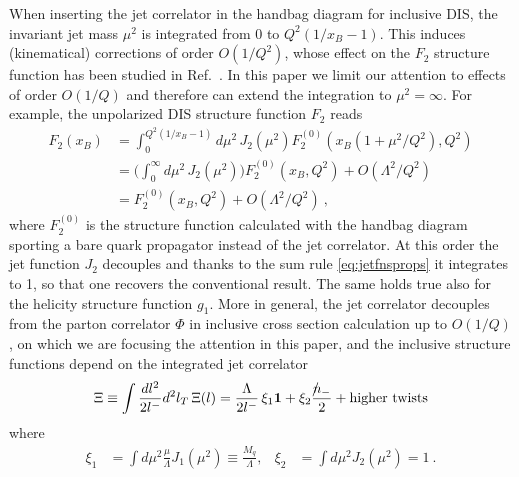 \documentclass[preprintnumbers,floatfix,nofootinbib]{revtex4}
\newcommand{\nslash}{n \hspace{-0.24cm} / \,}
\newcommand{\mj}{M_q}
\newcommand{\mjs}{\langle m_j^2 \rangle>}
\begin{document}
When inserting the jet correlator in the handbag diagram for inclusive DIS, the invariant jet mass $\mu^2$ is integrated from 0 to $Q^2(1/x_B-1)$. This induces (kinematical) corrections of order $O(1/Q^2)$, whose effect on the $F_2$ structure function has been studied in Ref.~\cite{Accardi-Qiu}. In this paper we limit our attention to effects of order $O(1/Q)$ and therefore can extend the integration to $\mu^2=\infty$. For example, the unpolarized DIS structure function $F_2$ reads
\begin{align}
  F_2(x_B) & = \int_0^{Q^2(1/x_B-1)}d\mu^2\, J_2(\mu^2) F_2^{(0)}(x_B(1+\mu^2/Q^2),Q^2)  \\
  & = \Big( \int_0^\infty d\mu^2\, J_2(\mu^2) \Big) F_2^{(0)}(x_B,Q^2) 
     + O(\Lambda^2/Q^2) \\
  & = F_2^{(0)}(x_B,Q^2)  + O(\Lambda^2/Q^2) \ ,
\label{eq:F2}
\end{align}
where $F_2^{(0)}$ is the structure function calculated with the handbag diagram sporting a bare quark propagator instead of the jet correlator.
At this order the jet function $J_2$ decouples and thanks to the sum rule \eqref{eq:jetfnsprops} it integrates to 1, so that one recovers the conventional result. The same holds true also for the helicity structure function $g_1$.
%
More in general, the jet correlator decouples from the parton correlator $\Phi$ in inclusive cross section calculation up to $O(1/Q)$, on which we are focusing the attention in this paper, and the inclusive structure functions depend on the integrated jet correlator
\begin{equation} 
  \Xi \equiv \int \frac{dl^2}{2l^-} d^2 l_T \, \Xi(l) 
    =  \frac{\Lambda}{2 l^-}\,\xi_1 {\bm 1}
    +  \xi_2 \frac{\nslash_-}{2} 
    + \text{higher\ twists}
\end{equation} 
where 
\begin{align}
\xi_1 &= \int d\mu^2 \frac{\mu}{\Lambda} J_1(\mu^2) 
       \equiv \frac{\mj}{\Lambda},
&
\xi_2 &= \int d\mu^2 J_2(\mu^2) = 1 \ .
\end{align} 
\end{document}
